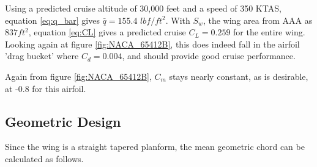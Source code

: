 \documentclass[conf]{new-aiaa}
\begin{document}

Using a predicted cruise altitude of 30,000 feet and a speed of 350 KTAS, equation \ref{eq:q_bar} 
gives $\bar{q} = 155.4$ $lbf/ft^2$. With $S_w$, the wing area from AAA as $837 ft^2$, 
equation \ref{eq:CL} gives a predicted cruise $C_L = 0.259$ for the entire wing. Looking again at 
figure \ref{fig:NACA_65412B}, this does indeed fall in the airfoil 'drag bucket' where $C_d = 0.004$, 
and should provide good cruise performance.

Again from figure \ref{fig:NACA_65412B}, $C_m$ stays nearly constant, as is desirable, at -0.8 for this airfoil.





\subsection{Geometric Design}


Since the wing is a straight tapered planform, the mean geometric chord can be calculated as follows.
\end{document}
